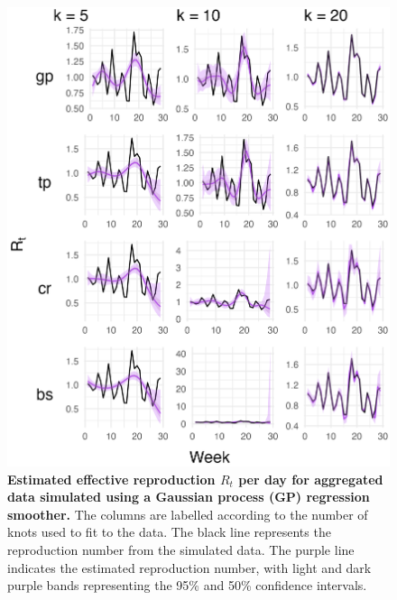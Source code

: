 \documentclass[
11pt, %
oneside, %
english, %
singlespacing, %
]{macthesis} %
\begin{document}
\begin{figure}[H]
\centering
\includegraphics[width=\textwidth]{figure/Simulated/aggregated/simulation_agg_gp_20_k(5,10,20)_bsd1_beta1_plot_R_t.png}
\caption[Estimated Simulated and Aggregated Data (GP) Effective Reproduction Number]{\textbf{Estimated effective reproduction \(R_t\) per day for aggregated data simulated using a Gaussian process (GP) regression smoother.} The columns are labelled according to the number of knots used to fit to the data. The black line represents the reproduction number from the simulated data. The purple line indicates the estimated reproduction number, with light and dark purple bands representing the 95\% and 50\% confidence intervals.}
\label{fig:Rt20_agg_gp}
\end{figure}
\end{document}
